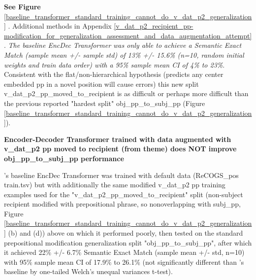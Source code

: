 \documentclass[11pt]{article}
\begin{document}
\textbf{See Figure} \ref{baseline_transformer_standard_training_cannot_do_v_dat_p2_generalization} . Additional methods in Appendix \ref{v_dat_p2_recipient_pp-modification_for_generalization_assessment_and_data_augmentation_attempt}.
\textit{The baseline \cite{Wu2023} EncDec Transformer was only able to achieve a Semantic Exact Match (sample mean +/- sample std) of 13\% +/- 15.6\% (n=10, random initial weights and train data order) with a 95\% sample mean CI of 4\% to 23\%}. Consistent with the flat/non-hierarchical hypothesis (predicts any center embedded pp in a novel position will cause errors) this new split v\_dat\_p2\_pp\_moved\_to\_recipient is as difficult or perhaps more difficult than the previous reported "hardest split" obj\_pp\_to\_subj\_pp (Figure \ref{baseline_transformer_standard_training_cannot_do_v_dat_p2_generalization}).

\textbf{\cite{Wu2023} Encoder-Decoder Transformer trained with data augmented with v\_dat\_p2 pp moved to recipient (from theme) does NOT improve obj\_pp\_to\_subj\_pp performance}

\cite{Wu2023}'s baseline EncDec Transformer was trained with default data (ReCOGS\_pos train.tsv) but with additionally the same modified v\_dat\_p2 pp training examples used for the "v\_dat\_p2\_pp\_moved\_to\_recipient" split (non-subject recipient modified with prepositional phrase, so nonoverlapping with subj\_pp, Figure \ref{baseline_transformer_standard_training_cannot_do_v_dat_p2_generalization} (b) and (d)) above on which it performed poorly, then tested on the standard prepositional modification generalization split "obj\_pp\_to\_subj\_pp", after which it achieved 22\% +/- 6.7\% Semantic Exact Match (sample mean +/- std, n=10) with 95\% sample mean CI of 17.9\% to 26.1\% (not significantly different than \cite{Wu2023}'s baseline by one-tailed Welch's unequal variances t-test).
\end{document}
